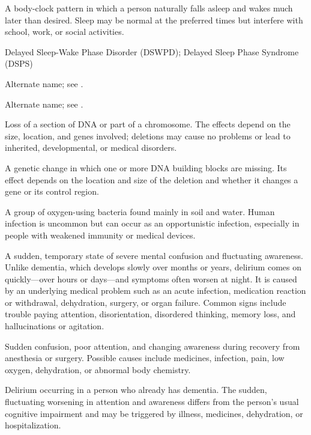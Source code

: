  A body-clock pattern in which a person naturally falls asleep and wakes much later than desired. Sleep may be normal at the preferred times but interfere with school, work, or social activities.

\synonyms
Delayed Sleep-Wake Phase Disorder (DSWPD); Delayed Sleep Phase Syndrome (DSPS)

 Alternate name; see .

 Alternate name; see .

 Loss of a section of DNA or part of a chromosome. The effects depend on the size, location, and genes involved; deletions may cause no problems or lead to inherited, developmental, or medical disorders.

 A genetic change in which one or more DNA building blocks are missing. Its effect depends on the location and size of the deletion and whether it changes a gene or its control region.

 A group of oxygen-using bacteria found mainly in soil and water. Human infection is uncommon but can occur as an opportunistic infection, especially in people with weakened immunity or medical devices.

 A sudden, temporary state of severe mental confusion and fluctuating awareness. Unlike dementia, which develops slowly over months or years, delirium comes on quickly---over hours or days---and symptoms often worsen at night. It is caused by an underlying medical problem such as an acute infection, medication reaction or withdrawal, dehydration, surgery, or organ failure. Common signs include trouble paying attention, disorientation, disordered thinking, memory loss, and hallucinations or agitation.

 Sudden confusion, poor attention, and changing awareness during recovery from anesthesia or surgery. Possible causes include medicines, infection, pain, low oxygen, dehydration, or abnormal body chemistry.

 Delirium occurring in a person who already has dementia. The sudden, fluctuating worsening in attention and awareness differs from the person’s usual cognitive impairment and may be triggered by illness, medicines, dehydration, or hospitalization.

